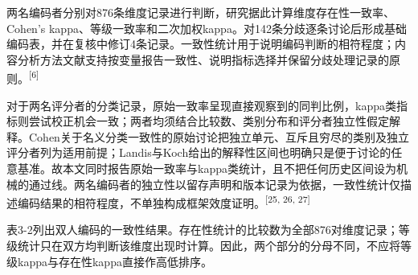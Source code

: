 \documentclass[
  12pt,
  a4paper]{ctexbook}
\begin{document}
两名编码者分别对876条维度记录进行判断，研究据此计算维度存在性一致率、Cohen's
kappa、等级一致率和二次加权kappa。对142条分歧逐条讨论后形成基础编码表，并在复核中修订4条记录。一致性统计用于说明编码判断的相符程度；内容分析方法文献支持按变量报告一致性、说明指标选择并保留分歧处理记录的原则。\textsuperscript{[6]}

对于两名评分者的分类记录，原始一致率呈现直接观察到的同判比例，kappa类指标则尝试校正机会一致；两者均须结合比较数、类别分布和评分者独立性假定解释。Cohen关于名义分类一致性的原始讨论把独立单元、互斥且穷尽的类别及独立评分者列为适用前提；Landis与Koch给出的解释性区间也明确只是便于讨论的任意基准。故本文同时报告原始一致率与kappa类统计，且不把任何历史区间设为机械的通过线。两名编码者的独立性以留存声明和版本记录为依据，一致性统计仅描述编码结果的相符程度，不单独构成框架效度证明。\textsuperscript{[25, 26, 27]}

表3-2列出双人编码的一致性结果。存在性统计的比较数为全部876对维度记录；等级统计只在双方均判断该维度出现时计算。因此，两个部分的分母不同，不应将等级kappa与存在性kappa直接作高低排序。
\end{document}
